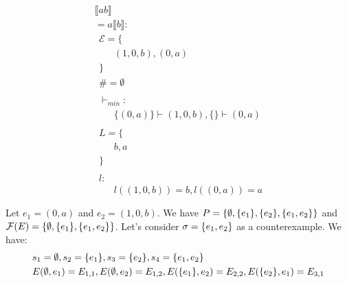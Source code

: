 \documentclass{article}
\begin{document}
\begin{align*}
     &                                                            & \\
     & \llbracket ab \rrbracket                                   & \\
     & = a\llbracket b \rrbracket:                                & \\
     & \ \ \mathcal{{E}}= \{                                      & \\
     & \qquad (1, 0, b), (0, a)                                     \\
     & \ \ \}                                                     & \\
     & \ \ \# = \emptyset                                         & \\
     & \ \                                                        & \\
     & \ \ \vdash_{{min}}:                                        & \\
     & \qquad \{ (0, a) \} \vdash (1, 0, b), \{  \} \vdash (0, a)   \\
     & \ \                                                        & \\
     & \ \ L=\{                                                   & \\
     & \qquad b, a                                                  \\
     & \ \ \}                                                     & \\
     & \ \                                                        & \\
     & \ \ l:                                                     & \\
     & \qquad l((1, 0, b)) = b, l((0, a)) = a                       \\
     & \ \                                                        & \\
\end{align*}
Let $e_1 = (0,a)$ and $e_2 = (1,0,b)$.
We have $P = \{ \emptyset, \{e_1\}, \{e_2\},\{e_1,e_2\} \}$
and $\mathcal{F}(E) = \{\emptyset, \{e_1\}, \{e_1,e_2\}\}$.
Let's consider $\sigma=\{e_1, e_2\}$ as a counterexample.
We have:
\begin{align*}
    &
    s_1 = \emptyset, s_2 = \{e_1\}, s_3 = \{e_2\},
    s_4 = \{e_1,e_2\} \\
    &
    E(\emptyset, e_1) = E_{1,1}, E(\emptyset, e_2) = E_{1,2},
    E(\{e_1\}, e_2) = E_{2,2}, E(\{e_2\}, e_1) = E_{3,1} \\
\end{align*}
\end{document}
